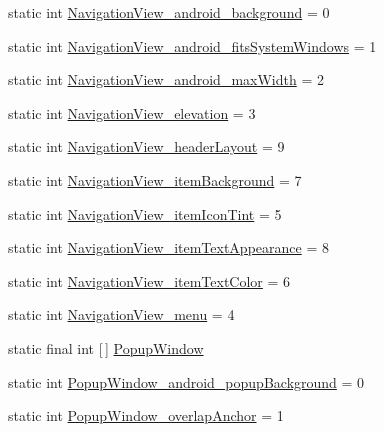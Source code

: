 \begin{DoxyCompactItemize}
\item 
static int \hyperlink{classandroid_1_1support_1_1v4_1_1R_1_1styleable_a8f98df409afda107e7ee23053b8a05b9}{Navigation\+View\+\_\+android\+\_\+background} = 0
\item 
static int \hyperlink{classandroid_1_1support_1_1v4_1_1R_1_1styleable_a8517e1a9f5ffb52c3548a89bc9417529}{Navigation\+View\+\_\+android\+\_\+fits\+System\+Windows} = 1
\item 
static int \hyperlink{classandroid_1_1support_1_1v4_1_1R_1_1styleable_ad0e7d3e854013e3ffc4d6bc317d99c0c}{Navigation\+View\+\_\+android\+\_\+max\+Width} = 2
\item 
static int \hyperlink{classandroid_1_1support_1_1v4_1_1R_1_1styleable_ac60a6df259fa99f7015ffb729a6e9f61}{Navigation\+View\+\_\+elevation} = 3
\item 
static int \hyperlink{classandroid_1_1support_1_1v4_1_1R_1_1styleable_a8beaea7d5f50233cb1a16143dfc217c8}{Navigation\+View\+\_\+header\+Layout} = 9
\item 
static int \hyperlink{classandroid_1_1support_1_1v4_1_1R_1_1styleable_afc0d87aca6dd3fb4c0540b58a90cca8e}{Navigation\+View\+\_\+item\+Background} = 7
\item 
static int \hyperlink{classandroid_1_1support_1_1v4_1_1R_1_1styleable_a66c3c759347c63fdcb441cb6933140c5}{Navigation\+View\+\_\+item\+Icon\+Tint} = 5
\item 
static int \hyperlink{classandroid_1_1support_1_1v4_1_1R_1_1styleable_a349ff552ebf7326a68f420379297db8e}{Navigation\+View\+\_\+item\+Text\+Appearance} = 8
\item 
static int \hyperlink{classandroid_1_1support_1_1v4_1_1R_1_1styleable_a23b2727a764707c6a7ea9c2eabf7a8d7}{Navigation\+View\+\_\+item\+Text\+Color} = 6
\item 
static int \hyperlink{classandroid_1_1support_1_1v4_1_1R_1_1styleable_a190d0d0a640befa4ce35b45bf2f3a67f}{Navigation\+View\+\_\+menu} = 4
\item 
static final int \mbox{[}$\,$\mbox{]} \hyperlink{classandroid_1_1support_1_1v4_1_1R_1_1styleable_ac336c55ce0f18f8d06778e7eab7b5f62}{Popup\+Window}
\item 
static int \hyperlink{classandroid_1_1support_1_1v4_1_1R_1_1styleable_a8d0ba5d280ce722ccd8a262e5a5a70ac}{Popup\+Window\+\_\+android\+\_\+popup\+Background} = 0
\item 
static int \hyperlink{classandroid_1_1support_1_1v4_1_1R_1_1styleable_a5c26831300739afea25f9941395ae022}{Popup\+Window\+\_\+overlap\+Anchor} = 1
\item 

\end{DoxyCompactItemize}
